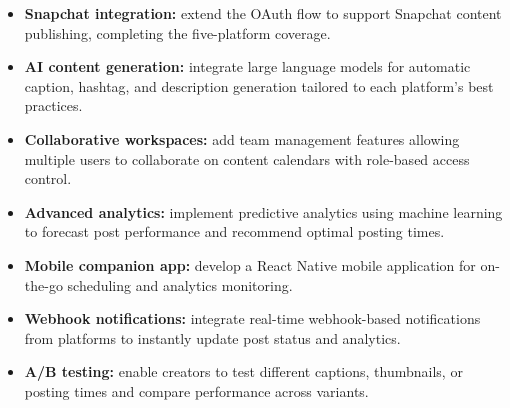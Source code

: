 \begin{itemize}
    \item \textbf{Snapchat integration:} extend the OAuth flow to support Snapchat content publishing, completing the five-platform coverage.
    \item \textbf{AI content generation:} integrate large language models for automatic caption, hashtag, and description generation tailored to each platform's best practices.
    \item \textbf{Collaborative workspaces:} add team management features allowing multiple users to collaborate on content calendars with role-based access control.
    \item \textbf{Advanced analytics:} implement predictive analytics using machine learning to forecast post performance and recommend optimal posting times.
    \item \textbf{Mobile companion app:} develop a React Native mobile application for on-the-go scheduling and analytics monitoring.
    \item \textbf{Webhook notifications:} integrate real-time webhook-based notifications from platforms to instantly update post status and analytics.
    \item \textbf{A/B testing:} enable creators to test different captions, thumbnails, or posting times and compare performance across variants.
\end{itemize}
